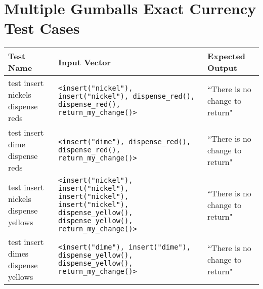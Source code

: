 \documentclass[10pt,letterpaper]{article}
\begin{document}
\section{Multiple Gumballs Exact Currency Test Cases}
\begin{table}[!htb]
\begin{tabularx}{\textwidth}{XXX}
\toprule
Test Name &
    Input Vector &
    Expected Output \\ \midrule
test insert nickels dispense reds &
    \texttt{<insert("nickel"), insert("nickel"), dispense\_red(), dispense\_red(), return\_my\_change()>} &
    ``There is no change to return" \\ \midrule
test insert dime dispense reds &
    \texttt{<insert("dime"), dispense\_red(), dispense\_red(), return\_my\_change()>} &
    ``There is no change to return" \\ \midrule
test insert nickels dispense yellows &
    \texttt{<insert("nickel"), insert("nickel"), insert("nickel"), insert("nickel"), dispense\_yellow(), dispense\_yellow(), return\_my\_change()>} &
    ``There is no change to return" \\ \midrule
test insert dimes dispense yellows &
    \texttt{<insert("dime"), insert("dime"), dispense\_yellow(), dispense\_yellow(), return\_my\_change()>} &
    ``There is no change to return" \\ \bottomrule
\end{tabularx}
\end{table}
\end{document}
